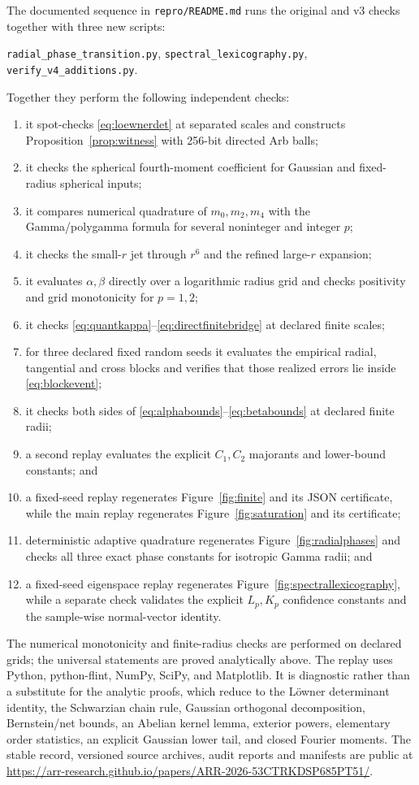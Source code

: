 \documentclass[11pt]{article}
\begin{document}
The documented sequence in \texttt{repro/README.md} runs the original and v3 checks together with three new
scripts:
\begin{center}
\texttt{radial\_phase\_transition.py},\quad
\texttt{spectral\_lexicography.py},\quad
\texttt{verify\_v4\_additions.py}.
\end{center}
Together they perform the following independent checks:
\begin{enumerate}[leftmargin=2em]
 \item it spot-checks \eqref{eq:loewnerdet} at separated scales and constructs Proposition~\ref{prop:witness} with
 256-bit directed Arb balls;
 \item it checks the spherical fourth-moment coefficient for Gaussian and fixed-radius spherical inputs;
 \item it compares numerical quadrature of $m_0,m_2,m_4$ with the Gamma/polygamma formula for several
 noninteger and integer $p$;
 \item it checks the small-$r$ jet through $r^6$ and the refined large-$r$ expansion;
 \item it evaluates $\alpha,\beta$ directly over a logarithmic radius grid and checks positivity and grid
 monotonicity for $p=1,2$;
 \item it checks \eqref{eq:quantkappa}--\eqref{eq:directfinitebridge} at declared finite scales;
 \item for three declared fixed random seeds it evaluates the empirical radial, tangential and cross blocks and
 verifies that those realized errors lie inside \eqref{eq:blockevent};
 \item it checks both sides of \eqref{eq:alphabounds}--\eqref{eq:betabounds} at declared finite radii;
 \item a second replay evaluates the explicit $C_1,C_2$ majorants and lower-bound constants; and
 \item a fixed-seed replay regenerates Figure~\ref{fig:finite} and its JSON certificate, while the main replay
 regenerates Figure~\ref{fig:saturation} and its certificate;
 \item deterministic adaptive quadrature regenerates Figure~\ref{fig:radialphases} and checks all three exact
 phase constants for isotropic Gamma radii; and
 \item a fixed-seed eigenspace replay regenerates Figure~\ref{fig:spectrallexicography}, while a separate check
 validates the explicit $L_p,K_p$ confidence constants and the sample-wise normal-vector identity.
\end{enumerate}
The numerical monotonicity and finite-radius checks are performed on declared grids; the universal statements are
proved analytically above.  The replay uses Python, python-flint, NumPy, SciPy, and Matplotlib.  It is diagnostic
rather than a substitute for
the analytic proofs, which reduce to the L\"owner determinant identity, the Schwarzian chain rule, Gaussian
orthogonal decomposition, Bernstein/net bounds, an Abelian kernel lemma, exterior powers, elementary order
statistics, an explicit Gaussian lower tail, and closed Fourier moments.
The stable record, versioned source archives, audit reports and manifests are public at
\url{https://arr-research.github.io/papers/ARR-2026-53CTRKDSP685PT51/}.
\end{document}
